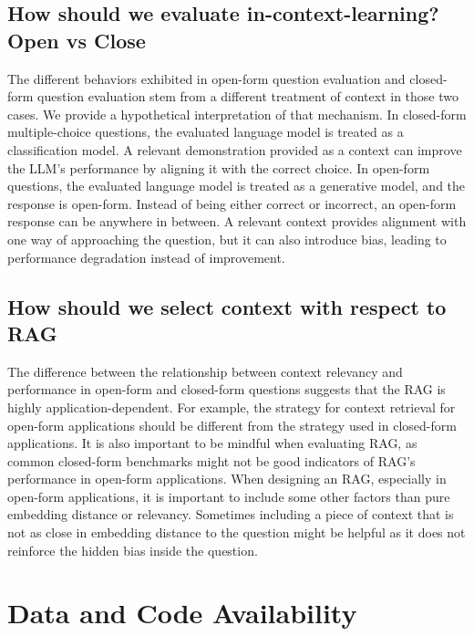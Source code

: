 \documentclass{article}
\begin{document}
\subsection{How should we evaluate in-context-learning? Open vs Close}

    The different behaviors exhibited in open-form question evaluation and closed-form question evaluation stem from a different treatment of context in those two cases. We provide a hypothetical interpretation of that mechanism. 
    In closed-form multiple-choice questions, the evaluated language model is treated as a classification model. A relevant demonstration provided as a context can improve the LLM's performance by aligning it with the correct choice. 
    In open-form questions, the evaluated language model is treated as a generative model, and the response is open-form. Instead of being either correct or incorrect, an open-form response can be anywhere in between. A relevant context provides alignment with one way of approaching the question, but it can also introduce bias, leading to performance degradation instead of improvement.
    
\subsection{How should we select context with respect to RAG}

    The difference between the relationship between context relevancy and performance in open-form and closed-form questions suggests that the RAG is highly application-dependent. For example, the strategy for context retrieval for open-form applications should be different from the strategy used in closed-form applications. It is also important to be mindful when evaluating RAG, as common closed-form benchmarks might not be good indicators of RAG's performance in open-form applications.
    When designing an RAG, especially in open-form applications, it is important to include some other factors than pure embedding distance or relevancy. Sometimes including a piece of context that is not as close in embedding distance to the question might be helpful as it does not reinforce the hidden bias inside the question. 
    



\section*{Data and Code Availability}
\end{document}
